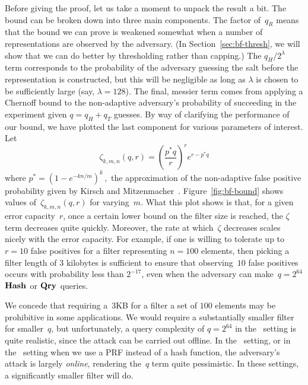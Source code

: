 Before giving the proof, let us take a moment to unpack the result a bit.  The
bound can be broken down into three main components. The factor
of~$q_R$ means that the bound we can prove is weakened somewhat when a number of
representations are observed by the adversary. (In Section~\ref{sec:bf-thresh},
we will show that we can do better by thresholding rather than capping.) The $q_H/2^\lambda$ term
corresponds to the probability of the adversary guessing the salt before the
representation is constructed, but this will be negligible as long as $\lambda$
is chosen to be sufficiently large (say, $\lambda=128$). The final, messier term
comes from applying a Chernoff bound to the non-adaptive adversary's probability
of succeeding in the experiment given $q = q_H+q_T$ guesses.
%
By way of clarifying the performance of our bound, we have plotted the last
component for various parameters of interest. Let
%
\begin{equation}\label{eq:zeta}
  \zeta_{k,m,n}(q,r) = \left(\frac{p^*q}{r}\right)^re^{r-p^*q}
\end{equation}
%
where
$
  p^* = (1-e^{-kn/m})^k \,,
$
the approximation of the non-adaptive false positive probability given by Kirsch
and Mitzenmacher~\cite{kirsch2006less}.
%
Figure~\ref{fig:bf-bound} shows values
of~$\zeta_{k,m,n}(q,r)$ for varying~$m$.
%
What this plot shows is that, for a given error capacity~$r$, once a certain lower
bound on the filter size is reached, the $\zeta$ term decreases quite quickly.
Moreover, the rate at which~$\zeta$ decreases scales nicely with the error
capacity.  For example, if one is willing to tolerate up to~$r=10$ false
positives for a filter representing $n=100$ elements, then picking a filter
length of $3$ kilobytes is sufficient to ensure that observing~$10$ false
positives occurs with probability less than $2^{-17}$, even when the adversary
can make~$q =2^{64}$ $\textup{\textbf{Hash}}\hspace{0.5pt}$ or $\textup{\textbf{Qry}}\hspace{0.5pt}$ queries.

We concede that requiring a~$3$KB for a filter a set of $100$ elements may be
prohibitive in some applications. We would require a substantially smaller
filter for smaller~$q$, but unfortunately, a query complexity of $q=2^{64}$ in
the \errep\ setting is quite realistic, since the attack can be carried out
offline.
%
In the \erreps\ setting, or in the \errep\ setting when we use a PRF instead of a
hash function, the adversary's attack is largely \emph{online}, rendering
the~$q$ term quite pessimistic. In these settings, a significantly smaller
filter will do.

